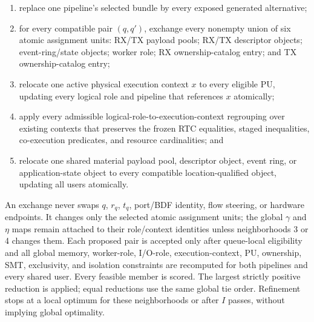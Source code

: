 \begin{enumerate}[leftmargin=*,itemsep=2pt]
  \item replace one pipeline's selected bundle by every exposed generated alternative;
  \item for every compatible pair $(q,q')$, exchange every nonempty union of six atomic assignment units: RX/TX payload pools; RX/TX descriptor objects; event-ring/state objects; worker role; RX ownership-catalog entry; and TX ownership-catalog entry;
  \item relocate one active physical execution context $x$ to every eligible PU, updating every logical role and pipeline that references $x$ atomically;
  \item apply every admissible logical-role-to-execution-context regrouping over existing contexts that preserves the frozen RTC equalities, staged inequalities, co-execution predicates, and resource cardinalities; and
  \item relocate one shared material payload pool, descriptor object, event ring, or application-state object to every compatible location-qualified object, updating all users atomically.
\end{enumerate}

An exchange never swaps $q$, $r_q$, $t_q$, port/BDF identity, flow steering, or hardware endpoints. It changes only the selected atomic assignment units; the global $\gamma$ and $\eta$ maps remain attached to their role/context identities unless neighborhoods 3 or 4 changes them. Each proposed pair is accepted only after queue-local eligibility and all global memory, worker-role, I/O-role, execution-context, PU, ownership, SMT, exclusivity, and isolation constraints are recomputed for both pipelines and every shared user. Every feasible member is scored. The largest strictly positive reduction is applied; equal reductions use the same global tie order. Refinement stops at a local optimum for these neighborhoods or after $I$ passes, without implying global optimality.

